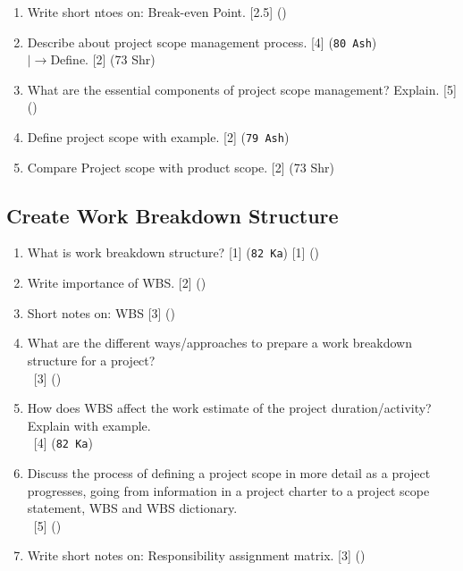 \documentclass[12pt]{article}
\newcommand{\lb}{\\$\left|\rightarrow\right.$}
\newcommand{\enter}{\\\textcolor{white}{1}}
\begin{document}
\begin{enumerate}
      \item Write short ntoes on: Break-even Point. \hfill [2.5] ()

      \item Describe about project scope management process. \hfill [4] (\texttt{80 Ash})
        \lb Define. \hfill [2] (73 Shr)

      \item What are the essential components of project scope management? Explain. \hfill [5] ()

      \item Define project scope with example. \hfill [2] (\texttt{79 Ash})
        
      \item Compare Project scope with product scope. \hfill [2] (73 Shr)
    \end{enumerate}

  \subsection{Create Work Breakdown Structure}
    \begin{enumerate}
      \item What is work breakdown structure? \hfill [1] (\texttt{82 Ka}) [1] ()

      \item Write importance of WBS. \hfill [2] ()

      \item Short notes on: WBS \hfill [3] ()

      \item What are the different ways/approaches to prepare a work breakdown structure for a project?
        \enter\hfill [3] ()
      
      \item How does WBS affect the work estimate of the project duration/activity? Explain with example.
        \enter\hfill [4] (\texttt{82 Ka})

      \item Discuss the process of defining a project scope in more detail as a project progresses, going from information in a project charter to a project scope statement, WBS and WBS dictionary.
        \enter\hfill [5] ()

      \item Write short notes on: Responsibility assignment matrix. \hfill [3] ()
    \end{enumerate}
\end{document}
